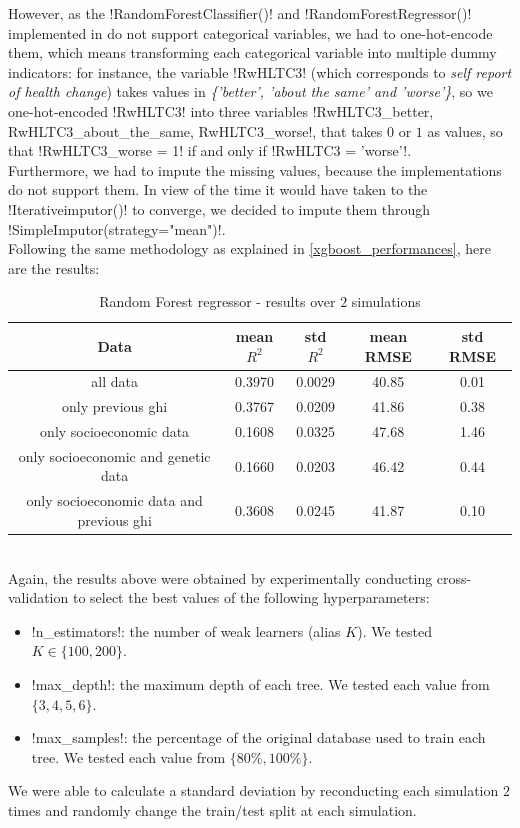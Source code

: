 \documentclass[]{article}
\begin{document}
\noindent
However, as the \pyth!RandomForestClassifier()! and \pyth!RandomForestRegressor()! implemented in \sklearn do not support categorical variables, we had to one-hot-encode them, which means transforming each categorical variable into multiple dummy indicators: for instance, the variable \pyth!RwHLTC3! (which corresponds to \textit{self report of health change}) takes values in \textit{\{'better', 'about the same' and 'worse'\}}, so we one-hot-encoded \pyth!RwHLTC3! into three variables \pyth!RwHLTC3_better, RwHLTC3_about_the_same, RwHLTC3_worse!, that takes $0$ or $1$ as values, so that \pyth!RwHLTC3_worse =  1! if and only if \pyth!RwHLTC3 = 'worse'!.\\
Furthermore, we had to impute the missing values, because the \sklearn implementations do not support them. In view of the time it would have taken to the \pyth!Iterativeimputor()! to converge, we decided to impute them through \pyth!SimpleImputor(strategy="mean")!.\\

\noindent
Following the same methodology as explained in \ref{xgboost_performances}, here are the results:
\begin{table}[!h]
	\centering
	\begin{tabular}{|c|c|c|c|c|}
		\hline
		\textbf{Data} & \textbf{mean $R^2$} & \textbf{std $R^2$} & \textbf{mean RMSE} & \textbf{std RMSE}\\
		\hline
		all data & 0.3970 & 0.0029 & 40.85 & 0.01 \\ 
		\hline
		only previous ghi & 0.3767 & 0.0209 & 41.86 & 0.38\\
		\hline 
		only socioeconomic data & 0.1608 & 0.0325 & 47.68 & 1.46\\
		\hline 
		only socioeconomic and genetic data & 0.1660 & 0.0203 & 46.42 & 0.44\\
		\hline 
		only socioeconomic data and previous ghi & 0.3608 &	0.0245 & 41.87 & 0.10\\
		\hline
	\end{tabular}
	\caption{Random Forest regressor - results over $2$ simulations}
	\label{results_randomforestregressor}
\end{table}\\
Again, the results above were obtained by experimentally conducting cross-validation to select the best values of the following hyperparameters:
\begin{itemize}
	\item \pyth!n_estimators!: the number of weak learners (alias $K$). We tested $K\in \{100, 200\}$.
	\item \pyth!max_depth!: the maximum depth of each tree. We tested each value from $\{3, 4, 5, 6\}$.
	\item \pyth!max_samples!: the percentage of the original database used to train each tree. We tested each value from $\{80\%, 100\%\}$.
\end{itemize}
We were able to calculate a standard deviation by reconducting each simulation $2$ times and randomly change the train/test split at each simulation.\\
\end{document}
